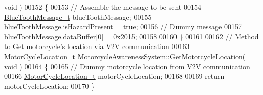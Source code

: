 \begin{DoxyCode}
{      void} )
00152 \{
00153     \textcolor{comment}{// Assemble the message to be sent}
00154     \hyperlink{structBlueToothMessage__t}{BlueToothMessage\_t} blueToothMessage;
00155     blueToothMessage.\hyperlink{structBlueToothMessage__t_a2dd315aa1cba1d2d3045e26b9f171e61}{isHazardPresent} = \textcolor{keyword}{true};
00156     \textcolor{comment}{// Dummy message}
00157     blueToothMessage.\hyperlink{structBlueToothMessage__t_ab872789a32f068dae8bcf77122256b78}{dataBuffer}[0] = 0x2015;
00158 
00160 \}
00161 
00162 \textcolor{comment}{// Method to Get motorcycle's location via V2V communication}
\hypertarget{MotorcycleAwarenessSystem_8cpp_source_l00163}{}\hyperlink{classMotorcycleAwarenessSystem_a840a5bc17d75276ecdb3a39d7aaf4109}{00163} \hyperlink{structMotorCycleLocation__t}{MotorCycleLocation\_t} 
      \hyperlink{classMotorcycleAwarenessSystem_a840a5bc17d75276ecdb3a39d7aaf4109}{MotorcycleAwarenessSystem::GetMotorcycleLocation}( \textcolor{keywordtype}{void} )
00164 \{
00165     \textcolor{comment}{// Dummy motorcycle location from V2V communication}
00166     \hyperlink{structMotorCycleLocation__t}{MotorCycleLocation\_t} motorCycleLocation;
00168 
00169     \textcolor{keywordflow}{return} motorCycleLocation;
00170 \}
\end{DoxyCode}
